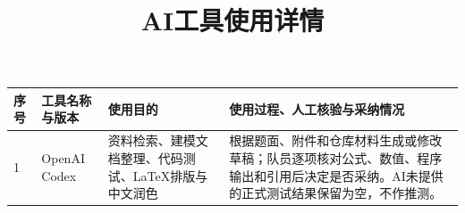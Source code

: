 \documentclass[UTF8,a4paper,12pt]{ctexart}
\title{AI工具使用详情}
\author{}
\date{}
\begin{document}
\maketitle
\begin{longtable}{p{}p{}p{}p{}}
\toprule
序号 & 工具名称与版本 & 使用目的 & 使用过程、人工核验与采纳情况 \\
\midrule
1 & OpenAI Codex & 资料检索、建模文档整理、代码测试、LaTeX排版与中文润色 & 根据题面、附件和仓库材料生成或修改草稿；队员逐项核对公式、数值、程序输出和引用后决定是否采纳。AI未提供的正式测试结果保留为空，不作推测。 \\
\bottomrule
\end{longtable}
\end{document}

